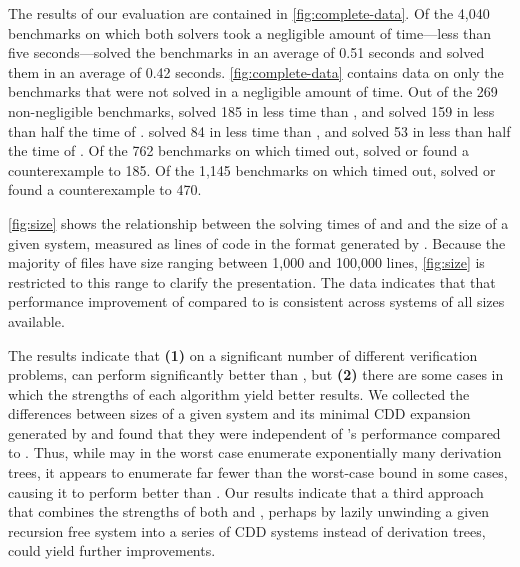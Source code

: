 \begin{figure}[t]
\begin{floatrow}[2]
  \end{floatrow}
\end{figure}
The results of our evaluation are contained in
\autoref{fig:complete-data}.
%
Of the 4,040 benchmarks on which both solvers took a negligible amount
of time---less than five seconds---\sys solved the benchmarks in an
average of 0.51 seconds and \duality solved them in an average of 0.42
seconds.
%
\autoref{fig:complete-data} contains data on only the benchmarks that
were not solved in a negligible amount of time.
Out of the 269 non-negligible benchmarks, \sys solved 185 in less time
than \duality, and solved 159 in less than half the time of \duality.
%
\duality solved 84 in less time than \sys, and solved 53 in less than
half the time of \sys.
%
Of the 762 benchmarks on which \sys timed out, \duality solved or
found a counterexample to 185.
%
Of the 1,145 benchmarks on which \duality timed out, \sys solved or
found a counterexample to 470.

\autoref{fig:size} shows the relationship between the solving times of
\duality and \sys and the size of a given system, measured as lines of
code in the format generated by \seahorn.
%
Because the majority of files have size ranging between 1,000 and
100,000 lines, \autoref{fig:size} is restricted to this range to
clarify the presentation.
%
The data indicates that that performance improvement of \sys compared
to \duality is consistent across systems of all sizes available.

The results indicate that \textbf{(1)} on a significant number of
different verification problems, \sys can perform significantly better than
\duality, but
%
\textbf{(2)} there are some cases in which the strengths of each
algorithm yield better results.
%
We collected the differences between sizes of a given system and its
minimal CDD expansion generated by \sys and found that they were
independent of \sys's performance compared to \duality.
%
Thus, while \duality may in the worst case enumerate exponentially
many derivation trees, it appears to enumerate far fewer
than the worst-case bound in some cases, causing it to perform better
than \sys.
%
Our results indicate that a third approach that combines the strengths
of both \duality and \sys, perhaps by lazily unwinding a given
recursion free system into a series of CDD systems instead of
derivation trees, could yield further improvements.

